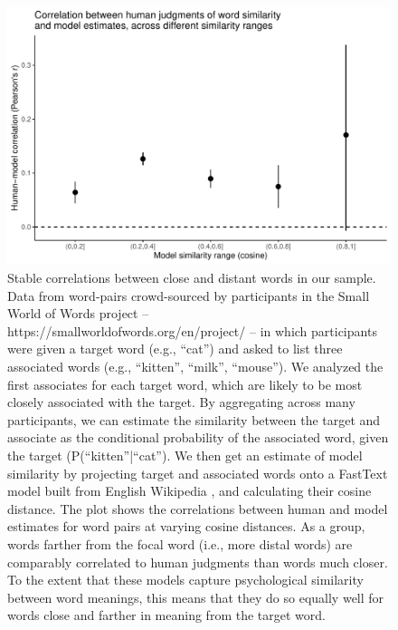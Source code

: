 \documentclass[9pt,twoside,lineno]{pnas-new}
\begin{document}
\begin{figure}[h]
{}
\end{figure}


\pagebreak
 \clearpage

\begin{figure}[h]
\centering
     \includegraphics{suppfigs/distance_validation_plot.pdf}
         \caption{Stable correlations between close and distant words in our sample.
         Data from word-pairs crowd-sourced by participants in the Small World of Words project -- https://smallworldofwords.org/en/project/ \cite{de2019small} -- in which participants were given a target word (e.g., ``cat'') and asked to list three associated words (e.g., ``kitten'', ``milk'', ``mouse''). We analyzed the first associates for each target word, which are likely to be most closely associated with the target. By aggregating across many participants, we can estimate the similarity between the target and associate as the conditional probability of the associated word, given the target (P(``kitten''|``cat''). We then get an estimate of model similarity by projecting target and associated words onto a FastText model built from English Wikipedia \cite{bojanowski2016enriching}, and calculating their cosine distance. The plot shows the correlations between human and model estimates for word pairs at varying cosine distances. As a group, words farther from the focal word (i.e., more distal words) are comparably correlated to human judgments than words much closer. To the extent that these models capture psychological similarity between word meanings, this means that they do so equally well for words close and farther in meaning from the target word. 
}
\end{figure}
\end{document}
